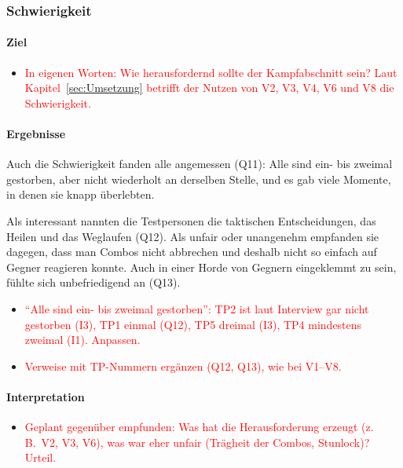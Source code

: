 \documentclass[../Main.tex]{subfiles}
\begin{document}
\subsubsection{Schwierigkeit}

\paragraph{Ziel}
\begin{itemize}[leftmargin=1.5cm]
    \item \textcolor{red}{In eigenen Worten: Wie herausfordernd sollte der Kampfabschnitt sein? Laut Kapitel~\ref{sec:Umsetzung} betrifft der Nutzen von V2, V3, V4, V6 und V8 die Schwierigkeit.}
\end{itemize}

\paragraph{Ergebnisse}
Auch die Schwierigkeit fanden alle angemessen (Q11): Alle sind ein- bis zweimal gestorben, aber nicht wiederholt an derselben Stelle, und es gab viele Momente, in denen sie knapp überlebten.

Als interessant nannten die Testpersonen die taktischen Entscheidungen, das Heilen und das Weglaufen (Q12). Als unfair oder unangenehm empfanden sie dagegen, dass man Combos nicht abbrechen und deshalb nicht so einfach auf Gegner reagieren konnte. Auch in einer Horde von Gegnern eingeklemmt zu sein, fühlte sich unbefriedigend an (Q13).

\begin{itemize}[leftmargin=1.5cm]
    \item \textcolor{red}{\enquote{Alle sind ein- bis zweimal gestorben}: TP2 ist laut Interview gar nicht gestorben (I3), TP1 einmal (Q12), TP5 dreimal (I3), TP4 mindestens zweimal (I1). Anpassen.}
    \item \textcolor{red}{Verweise mit TP-Nummern ergänzen (Q12, Q13), wie bei V1--V8.}
\end{itemize}

\paragraph{Interpretation}
\begin{itemize}[leftmargin=1.5cm]
    \item \textcolor{red}{Geplant gegenüber empfunden: Was hat die Herausforderung erzeugt (z.\,B.\ V2, V3, V6), was war eher unfair (Trägheit der Combos, Stunlock)? Urteil.}
\end{itemize}
\end{document}
